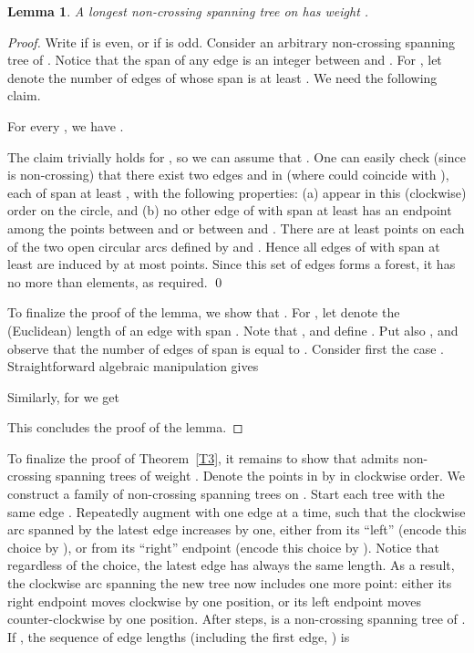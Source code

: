 \documentclass[11pt]{article}
\newtheorem{lemma}{Lemma}
\begin{document}
\begin{lemma} \label{L1}
A longest non-crossing spanning tree on  has weight .
\end{lemma}
\begin{proof}
Write  if  is even, or  if  is odd.
Consider an arbitrary non-crossing spanning tree  of .
Notice that the span of any edge is an integer between  and .
For , let  denote the number of edges of  whose
span is at least . We need the following claim.

\smallskip
{}
For every , we have .

\smallskip
{}
The claim trivially holds for , so we can assume that
. One can easily check (since  is non-crossing) that
there exist two edges  and  in  (where 
could coincide with ), each of span at least , with the
following properties:
(a)  appear in this (clockwise) order on the circle,
and (b) no other edge of  with span at least  has an endpoint
among the points between  and  or between  and .
There are at least  points on each of the two open circular arcs
defined by  and . Hence all edges
of  with span at least  are induced by at most  points.
Since this set of edges forms a forest, it has no more than
 elements, as required.
\qed

\medskip
To finalize the proof of the lemma, we show that .
For , let  denote the (Euclidean) length of
an edge with span . Note that , and
define . Put also , and observe that the number of edges
of span  is equal to . Consider first the case .
Straightforward algebraic manipulation gives

Similarly, for  we get

This concludes the proof of the lemma.
\end{proof}

To finalize the proof of Theorem~\ref{T3}, it remains to show that  admits
 non-crossing spanning trees of weight .
Denote the points in  by  in clockwise order.
We construct a family of non-crossing spanning trees on . Start each
tree with the same edge . Repeatedly augment  with one
edge at a time, such that the clockwise arc spanned by the latest edge increases by one,
either from its ``left'' (encode this choice by ), or from its ``right''
endpoint (encode this choice by ). Notice that regardless of the choice,
the latest edge has always the same length. As a result, the clockwise arc
spanning the new tree  now includes one more point: either its right
endpoint moves clockwise by one position, or its left endpoint moves
counter-clockwise by one position. After  steps,  is a non-crossing
spanning tree of . If , the sequence of edge lengths (including
the first edge, ) is
\end{document}
